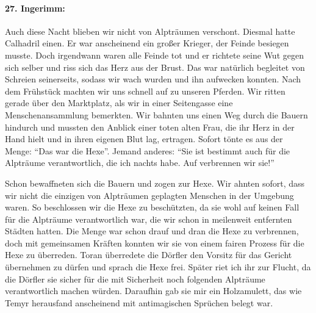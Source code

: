 \paragraph{27. Ingerimm:}
Auch diese Nacht blieben wir nicht von Alpträumen verschont. Diesmal hatte Calhadril einen. Er war anscheinend ein großer Krieger, der Feinde besiegen musste. Doch irgendwann waren alle Feinde tot und er richtete seine Wut gegen sich selber und riss sich das Herz aus der Brust. Das war natürlich begleitet von Schreien seinerseits, sodass wir wach wurden und ihn aufwecken konnten. Nach dem Frühstück machten wir uns schnell auf zu unseren Pferden. Wir ritten gerade über den Marktplatz, als wir in einer Seitengasse eine Menschenansammlung bemerkten. Wir bahnten uns einen Weg durch die Bauern hindurch und mussten den Anblick einer toten alten Frau, die ihr Herz in der Hand hielt und in ihren eigenen Blut lag, ertragen. Sofort tönte es aus der Menge: ``Das war die Hexe''. Jemand anderes: ``Sie ist bestimmt auch für die Alpträume verantwortlich, die ich nachts habe. Auf verbrennen wir sie!'' 


Schon bewaffneten sich die Bauern und zogen zur Hexe. Wir ahnten sofort, dass wir nicht die einzigen von Alpträumen geplagten Menschen in der Umgebung waren. So beschlossen wir die Hexe zu beschützten, da sie wohl auf keinen Fall für die Alpträume verantwortlich war, die wir schon in meilenweit entfernten Städten hatten. Die Menge war schon drauf und dran die Hexe zu verbrennen, doch mit gemeinsamen Kräften konnten wir sie von einem fairen Prozess für die Hexe zu überreden. Toran überredete die Dörfler den Vorsitz für das Gericht übernehmen zu dürfen und sprach die Hexe frei. Später riet ich ihr zur Flucht, da die Dörfler sie sicher für die mit Sicherheit noch folgenden Alpträume verantwortlich machen würden. Daraufhin gab sie mir ein Holzamulett, das wie Temyr herausfand anscheinend mit antimagischen Sprüchen belegt war.


